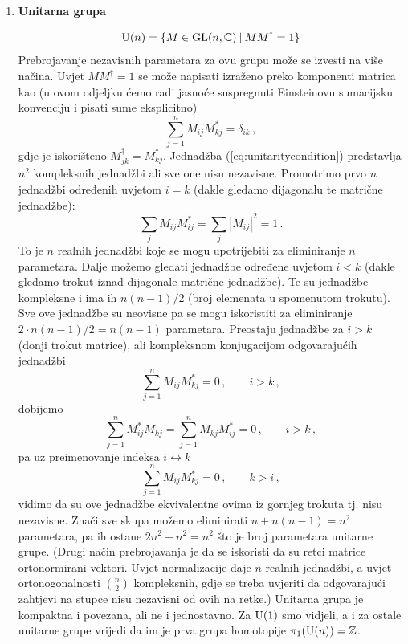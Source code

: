 \begin{enumerate}[leftmargin=0pt, itemindent=0pt]
\item \textbf{Unitarna grupa}

\begin{equation}
\mathrm{U}(n) = \{ M\in \mathrm{GL}(n,\mathbb{C}) \: | \: M M^{\dagger} = 1\}
\end{equation}
Prebrojavanje nezavisnih parametara za ovu grupu može se izvesti
na više načina. Uvjet $M M^\dagger = 1$ se može napisati izraženo
preko komponenti matrica kao (u ovom odjeljku ćemo radi jasnoće
suspregnuti Einsteinovu sumacijsku konvenciju i pisati sume eksplicitno)
\begin{equation}
\sum_{j=1}^{n} M_{ij} M_{kj}^* = \delta_{ik}\,,
\label{eq:unitaritycondition}
\end{equation}
gdje je iskorišteno $M^{\dagger}_{jk} = M^{*}_{kj}$.
Jednadžba (\ref{eq:unitaritycondition}) predstavlja $n^2$ kompleksnih
jednadžbi ali sve one nisu nezavisne. Promotrimo prvo $n$ jednadžbi
određenih uvjetom $i=k$ (dakle gledamo dijagonalu te matrične jednadžbe):
\begin{equation}
 \sum_j M_{ij} M^{*}_{ij} = \sum_j |M_{ij}|^2 = 1 \,.
\label{eq:diagonalcondition}
\end{equation}
To je $n$ realnih jednadžbi koje se mogu upotrijebiti za eliminiranje
$n$ parametara. Dalje možemo gledati jednadžbe određene uvjetom
$i < k$ (dakle gledamo trokut iznad dijagonale matrične jednadžbe).
Te su jednadžbe kompleksne i ima ih $n(n-1)/2$ (broj elemenata u 
spomenutom trokutu). Sve ove jednadžbe su neovisne pa se mogu
iskoristiti za eliminiranje $2 \cdot n(n-1)/2 = n(n-1)$ parametara.
Preostaju jednadžbe za $i >k$ (donji trokut matrice), ali kompleksnom
konjugacijom odgovarajućih jednadžbi
\begin{equation}
\sum_{j=1}^{n} M_{ij} M_{kj}^* = 0\,, \qquad i>k \,,
\end{equation}
dobijemo
\begin{equation}
\sum_{j=1}^{n} M_{ij}^* M_{kj}  = \sum_{j=1}^{n} M_{kj} M_{ij}^* = 0\,, \qquad i>k \,,
\end{equation}
pa uz preimenovanje indeksa $i \leftrightarrow k$
\begin{equation}
\sum_{j=1}^{n}  M_{ij} M_{kj}^* = 0\,, \qquad k>i \,,
\end{equation}
vidimo da su ove jednadžbe ekvivalentne ovima iz gornjeg trokuta tj. nisu
nezavisne.
Znači sve skupa možemo eliminirati $n + n(n-1) = n^2$ parametara, pa ih
ostane $2n^2 - n^2 = n^2$ što je broj parametara unitarne grupe.
(Drugi način prebrojavanja je da se iskoristi da su retci matrice ortonormirani
vektori. Uvjet normalizacije daje $n$ realnih jednadžbi, a uvjet
ortonogonalnosti $\binom{n}{2}$ kompleksnih, gdje se treba uvjeriti
da odgovarajući zahtjevi na stupce nisu nezavisni od ovih na retke.)
Unitarna grupa je kompaktna i povezana, ali ne i jednostavno. Za $\mathrm{U}(1)$
smo vidjeli, a i za ostale unitarne grupe
vrijedi da im je prva grupa homotopije $\pi_{1}(\mathrm{U}(n)) = \mathbb{Z}$.


\end{enumerate}
